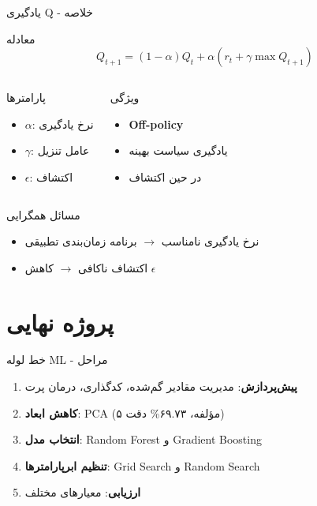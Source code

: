 \documentclass[aspectratio=169]{beamer}
\begin{document}
\begin{frame}{یادگیری Q - خلاصه}
\begin{block}{معادله}
\begin{equation*}
Q_{t+1} = (1-\alpha)Q_t + \alpha(r_t + \gamma \max Q_{t+1})
\end{equation*}
\end{block}

\begin{columns}
\begin{block}{پارامترها}
\begin{itemize}
\item $\alpha$: نرخ یادگیری
\item $\gamma$: عامل تنزیل
\item $\epsilon$: اکتشاف
\end{itemize}
\end{block}

\begin{block}{ویژگی}
\begin{itemize}
\item \textbf{Off-policy}
\item یادگیری سیاست بهینه
\item در حین اکتشاف
\end{itemize}
\end{block}
\end{columns}

\begin{block}{مسائل همگرایی}
\begin{itemize}
\item نرخ یادگیری نامناسب $\rightarrow$ برنامه زمان‌بندی تطبیقی
\item اکتشاف ناکافی $\rightarrow$ کاهش $\epsilon$
\end{itemize}
\end{block}
\end{frame}

\section{پروژه نهایی}

\begin{frame}{خط لوله ML - مراحل}
\begin{enumerate}
\item \textbf{پیش‌پردازش}: مدیریت مقادیر گم‌شده، کدگذاری، درمان پرت
\item \textbf{کاهش ابعاد}: PCA (۵ مؤلفه، ۶۹.۷۳\% دقت)
\item \textbf{انتخاب مدل}: Random Forest و Gradient Boosting
\item \textbf{تنظیم ابرپارامترها}: Grid Search و Random Search
\item \textbf{ارزیابی}: معیارهای مختلف
\end{enumerate}
\end{frame}
\end{document}
